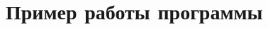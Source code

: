 \documentclass[specialist, substylefile = spbureport.rtx,
    subf,href,colorlinks=true, 12pt]{disser}
\begin{document}


    \section{Пример работы программы}
        

    



    \conclusion



\end{document}
